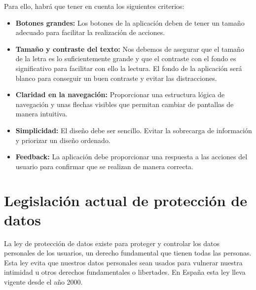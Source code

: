 Para ello, habrá que tener en cuenta los siguientes criterios:

\begin{itemize}
	\item \textbf{Botones grandes:} Los botones de la aplicación deben de tener un tamaño adecuado para facilitar la realización de acciones. 
	\item \textbf{Tamaño y contraste del texto:} Nos debemos de asegurar que el tamaño de la letra es lo suficientemente grande y que el contraste con el fondo es significativo para facilitar con ello la lectura. El fondo de la aplicación será blanco para conseguir un buen contraste y evitar las distracciones. 
	\item \textbf{Claridad en la navegación:} Proporcionar una estructura lógica de navegación y unas flechas visibles que permitan cambiar de pantallas de manera intuitiva. 
	\item \textbf{Simplicidad:} El diseño debe ser sencillo. Evitar la sobrecarga de información y priorizar un diseño ordenado. 
	\item \textbf{Feedback:} La aplicación debe proporcionar una respuesta a las acciones del usuario para confirmar que se realizan de manera correcta. 
\end{itemize} 

\newpage

\section{Legislación actual de protección de datos}

La ley de protección de datos existe para proteger y controlar los datos personales de los usuarios, un derecho fundamental que tienen todas las personas. Esta ley evita que nuestros datos personales sean usados para vulnerar nuestra intimidad u otros derechos fundamentales o libertades. En España esta ley lleva vigente desde el año 2000. \cite{proteccionDatos}\\

